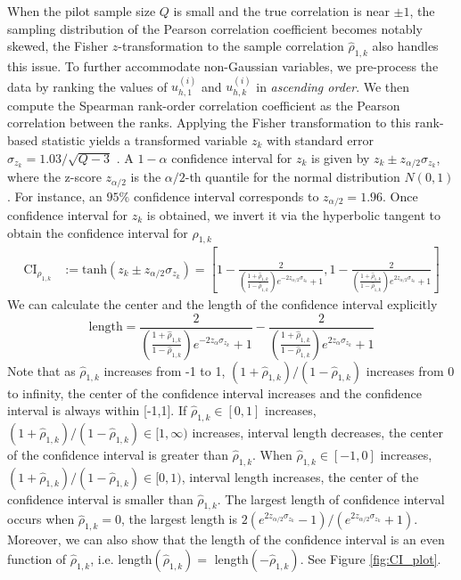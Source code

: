 When the pilot sample size $Q$ is small and the true correlation is near $\pm 1$, the sampling distribution of the Pearson correlation coefficient becomes notably skewed, the Fisher $z$-transformation to the sample correlation $\widehat \rho_{1,k}$ also handles this issue. To further accommodate non-Gaussian variables, we pre-process the data by ranking the values of $u_{h,1}^{(i)}$ and ${u}_{h,k}^{(i)}$ in {\it ascending order}. We then compute the Spearman rank-order correlation coefficient as the Pearson correlation between the ranks. Applying the Fisher transformation to this rank-based statistic yields a transformed variable $z_k$ with standard error $\sigma_{z_k} = 1.03/\sqrt{Q - 3}$ \cite{BiHi:2017, FiHaPe:1957}. A $1-\alpha$ confidence interval for $z_{k}$ is given by $z_k \pm z_{\alpha/2}\sigma_{z_k}$, where the z-score $z_{\alpha/2}$ is the $\alpha/2$-th quantile for the normal distribution $N(0,1)$. For instance, an $95\%$ confidence interval corresponds to $z_{\alpha/2} = 1.96$. Once confidence interval for $z_k$ is obtained, we invert it via the hyperbolic tangent to obtain the confidence interval for $\rho_{1,k}$
%
\begin{align}
    \label{eq:Confidence_Interval_rho}
    \text{CI}_{\rho_{1,k}} &:= \text{tanh}\left(z_k \pm  z_{\alpha/2}\sigma_{z_k}\right)
    =\left[1-\frac{2}{\left(\frac{1+\widehat\rho_{1,k}}{1-\widehat\rho_{1,k}}\right)e^{-2z_{\alpha/2}\sigma_{z_k}}+1}, 1-\frac{2}{\left(\frac{1+\widehat\rho_{1,k}}{1-\widehat\rho_{1,k}}\right)e^{2z_{\alpha/2}\sigma_{z_k}}+1}\right]
\end{align}
%
We can calculate the center and the length of the confidence interval explicitly
\[
\text{length} = \frac{2}{\left(\frac{1+\widehat\rho_{1,k}}{1-\widehat\rho_{1,k}}\right)e^{-2z_\alpha\sigma_{z_k}}+1}-\frac{2}{\left(\frac{1+\widehat\rho_{1,k}}{1-\widehat\rho_{1,k}}\right)e^{2z_\alpha\sigma_{z_k}}+1}
\]
Note that as $\widehat\rho_{1,k}$ increases from -1 to 1, $(1+\widehat\rho_{1,k})/(1-\widehat\rho_{1,k})$ increases from 0 to infinity, the center of the confidence interval increases and the confidence interval is always within [-1,1]. If $\widehat\rho_{1,k}\in[0,1]$ increases, $(1+\widehat\rho_{1,k})/(1-\widehat\rho_{1,k})\in [1,\infty)$ increases, interval length decreases, the center of the confidence interval is greater than $\widehat \rho_{1,k}$. When $\widehat\rho_{1,k}\in[-1,0]$ increases, $(1+\widehat\rho_{1,k})/(1-\widehat\rho_{1,k})\in [0,1)$, interval length increases, the center of the confidence interval is smaller than $\widehat \rho_{1,k}$. The largest length of confidence interval occurs when $\widehat \rho_{1,k}=0$, the largest length is $2(e^{2z_{\alpha/2}\sigma_{z_k}}-1)/(e^{2z_{\alpha/2}\sigma_{z_k}}+1)$. Moreover, we can also show that the length of the confidence interval is an even function of $\widehat \rho_{1,k}$, i.e. length$(\widehat \rho_{1,k})=$ length$(-\widehat \rho_{1,k})$. See Figure \ref{fig:CI_plot}.

